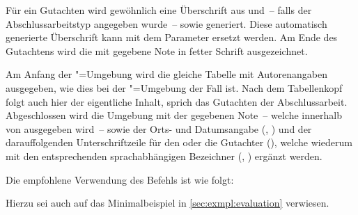 \begin{DeclareEntity}{}
\begin{Declaration}
\begin{Declaration}
\begin{Declaration}
Für ein Gutachten wird gewöhnlich eine Überschrift aus  
und~-- falls der Abschlussarbeitstyp angegeben wurde~--  
sowie  generiert. Diese automatisch generierte Überschrift kann 
mit dem Parameter  ersetzt werden. Am 
Ende des Gutachtens wird die mit  
gegebene Note in fetter Schrift ausgezeichnet.

Am Anfang der "=Umgebung wird die gleiche Tabelle mit 
Autorenangaben ausgegeben, wie dies bei der "=Umgebung der 
Fall ist. Nach dem Tabellenkopf folgt auch hier der eigentliche Inhalt, sprich 
das Gutachten der Abschlussarbeit. Abgeschlossen wird die Umgebung mit der 
gegebenen Note~-- welche innerhalb von  ausgegeben wird~-- 
sowie der Orts- und Datumsangabe (, ) und der 
darauffolgenden Unterschriftzeile für den oder die Gutachter (), 
welche wiederum mit den entsprechenden sprachabhängigen Bezeichner 
(, ) ergänzt werden.
\end{Declaration}
\end{Declaration}
\end{Declaration}

%
\begin{Example}
Die empfohlene Verwendung des Befehls  ist wie folgt:
\begin{Code}
\end{Code}
Hierzu sei auch auf das Minimalbeispiel in \autoref{sec:exmpl:evaluation} 
verwiesen.
%
\end{Example}


\end{DeclareEntity}
